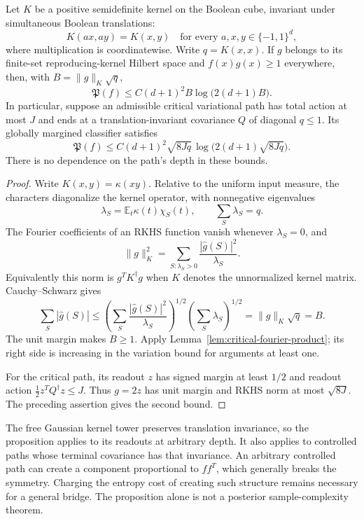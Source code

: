 \begin{proposition}
\label{prop:critical-invariant-kernel-product}
Let $K$ be a positive semidefinite kernel on the Boolean cube, invariant
under simultaneous Boolean translations:
\[
 K(ax,ay)=K(x,y)\quad\text{for every }a,x,y\in\{-1,1\}^d,
\]
where multiplication is coordinatewise. Write $q=K(x,x)$.
If $g$ belongs to its finite-set reproducing-kernel Hilbert space and
$f(x)g(x)\ge1$ everywhere, then, with $B=\|g\|_K\sqrt q$,
\[
 \mathfrak P(f)\le C(d+1)^2B\log\bigl(2(d+1)B\bigr).
\]
In particular, suppose an admissible critical variational path has
total action at most $J$ and ends at a translation-invariant covariance
$Q$ of diagonal $q\le1$. Its globally margined classifier satisfies
\[
 \mathfrak P(f)\le C(d+1)^2\sqrt{8Jq}\,
            \log\bigl(2(d+1)\sqrt{8Jq}\bigr).
\]
There is no dependence on the path's depth in these bounds.
\end{proposition}

\begin{proof}
Write $K(x,y)=\kappa(xy)$. Relative to the uniform input measure, the
characters diagonalize the kernel operator, with nonnegative eigenvalues
\[
 \lambda_S=\mathbb E_t\kappa(t)\chi_S(t),
 \qquad \sum_S\lambda_S=q.
\]
The Fourier coefficients of an RKHS function vanish whenever
$\lambda_S=0$, and
\[
 \|g\|_K^2=\sum_{S:\lambda_S>0}\frac{|\widehat g(S)|^2}{\lambda_S}.
\]
Equivalently this norm is $g^TK^\dagger g$ when $K$ denotes the
unnormalized kernel matrix. Cauchy--Schwarz gives
\[
 \sum_S|\widehat g(S)|
 \le\left(\sum_S\frac{|\widehat g(S)|^2}{\lambda_S}\right)^{1/2}
      \left(\sum_S\lambda_S\right)^{1/2}
 =\|g\|_K\sqrt q=B.
\]
The unit margin makes $B\ge1$. Apply
Lemma~\ref{lem:critical-fourier-product}; its right side is increasing
in the variation bound for arguments at least one.

For the critical path, its readout $z$ has signed margin at least $1/2$
and readout action $\tfrac12 z^TQ^\dagger z\le J$.
Thus $g=2z$ has unit margin and RKHS norm at most $\sqrt{8J}$.
The preceding assertion gives the second bound.
\end{proof}

The free Gaussian kernel tower preserves translation invariance, so the
proposition applies to its readouts at arbitrary depth. It also applies
to controlled paths whose terminal covariance has that invariance.
An arbitrary controlled path can create a component proportional to
$ff^T$, which generally breaks the symmetry. Charging the entropy cost
of creating such structure remains necessary for a general bridge.
The proposition alone is not a posterior sample-complexity theorem.
